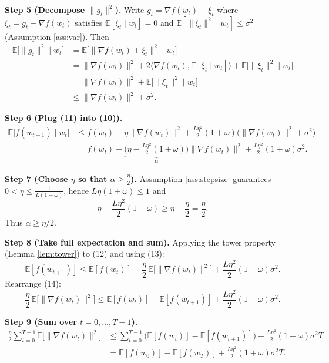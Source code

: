 \documentclass{article}
\newcommand{\E}{\mathbb{E}}
\begin{document}
\noindent\textbf{Step 5 (Decompose $\|g_{t}\|^{2}$).}  
Write $g_{t}= \nabla f(w_{t}) + \xi_{t}$ where
$\xi_{t}=g_{t}-\nabla f(w_{t})$ satisfies $\E[\xi_{t}\mid w_{t}]=0$ and
$\E[\|\xi_{t}\|^{2}\mid w_{t}]\le\sigma^{2}$ (Assumption \ref{ass:var}). Then
\[
\begin{aligned}
\E\!\big[\|g_{t}\|^{2}\mid w_{t}\big]
&= \E\!\big[\|\nabla f(w_{t})+\xi_{t}\|^{2}\mid w_{t}\big] \\
&= \|\nabla f(w_{t})\|^{2}
   +2\langle\nabla f(w_{t}),\E[\xi_{t}\mid w_{t}]\rangle
   +\E\!\big[\|\xi_{t}\|^{2}\mid w_{t}\big] \\
&= \|\nabla f(w_{t})\|^{2} + \E\!\big[\|\xi_{t}\|^{2}\mid w_{t}\big] \\
&\le \|\nabla f(w_{t})\|^{2} + \sigma^{2}. \tag{11}
\end{aligned}
\]

\noindent\textbf{Step 6 (Plug (11) into (10)).}
\[
\begin{aligned}
\E\!\big[f(w_{t+1})\mid w_{t}\big]
&\le f(w_{t})-\eta\|\nabla f(w_{t})\|^{2}
   +\frac{L\eta^{2}}{2}(1+\omega)
      \big(\|\nabla f(w_{t})\|^{2}+\sigma^{2}\big) \\
&= f(w_{t})
   -\underbrace{\Big(\eta-\frac{L\eta^{2}}{2}(1+\omega)\Big)}_{\displaystyle
      \alpha}\|\nabla f(w_{t})\|^{2}
   +\frac{L\eta^{2}}{2}(1+\omega)\sigma^{2}. \tag{12}
\end{aligned}
\]

\noindent\textbf{Step 7 (Choose $\eta$ so that $\alpha\ge\frac{\eta}{2}$).}  
Assumption \ref{ass:stepsize} guarantees $0<\eta\le\frac{1}{L(1+\omega)}$,
hence $L\eta(1+\omega)\le1$ and
\[
\eta-\frac{L\eta^{2}}{2}(1+\omega)
   \ge \eta-\frac{\eta}{2}= \frac{\eta}{2}. \tag{13}
\]
Thus $\alpha\ge \eta/2$.

\noindent\textbf{Step 8 (Take full expectation and sum).}  
Applying the tower property (Lemma \ref{lem:tower}) to (12) and using (13):
\[
\E[f(w_{t+1})]\le \E[f(w_{t})]
   -\frac{\eta}{2}\,\E\!\big[\|\nabla f(w_{t})\|^{2}\big]
   +\frac{L\eta^{2}}{2}(1+\omega)\sigma^{2}. \tag{14}
\]
Rearrange (14):
\[
\frac{\eta}{2}\,\E\!\big[\|\nabla f(w_{t})\|^{2}\big]
\le \E[f(w_{t})]-\E[f(w_{t+1})]
   +\frac{L\eta^{2}}{2}(1+\omega)\sigma^{2}. \tag{15}
\]

\noindent\textbf{Step 9 (Sum over $t=0,\dots,T-1$).}
\[
\begin{aligned}
\frac{\eta}{2}\sum_{t=0}^{T-1}\E\!\big[\|\nabla f(w_{t})\|^{2}\big]
&\le \sum_{t=0}^{T-1}\big(\E[f(w_{t})]-\E[f(w_{t+1})]\big)
   +\frac{L\eta^{2}}{2}(1+\omega)\sigma^{2} T \\
&= \E[f(w_{0})]-\E[f(w_{T})]
   +\frac{L\eta^{2}}{2}(1+\omega)\sigma^{2} T. \tag{16}
\end{aligned}
\]
\end{document}
